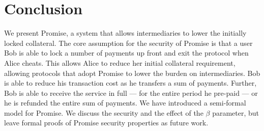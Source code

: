 \documentclass[runningheads]{llncs}
\newcommand{\sys}{Promise\xspace}
\newcommand{\todom}[1]{\todo[linecolor=green,backgroundcolor=green!25,bordercolor=green,inline,caption={}]{Todo for Dominik: #1}}
\begin{document}


\section{Conclusion}
\label{sec:conclusion}

We present \sys, a system that allows intermediaries to lower the initially locked collateral.
The core assumption for the security of \sys is that a user Bob is able to lock a number of payments up front and exit the protocol when Alice cheats.
This allows Alice to reduce her initial collateral requirement, allowing protocols that adopt \sys to lower the burden on intermediaries.
Bob is able to reduce his transaction cost as he transfers a sum of payments.
Further, Bob is able to receive the service in full --- for the entire period he pre-paid --- or he is refunded the entire sum of payments.
We have introduced a semi-formal model for \sys.
We discuss the security and the effect of the $\beta$ parameter, but leave formal proofs of \sys security properties as future work.




\end{document}
